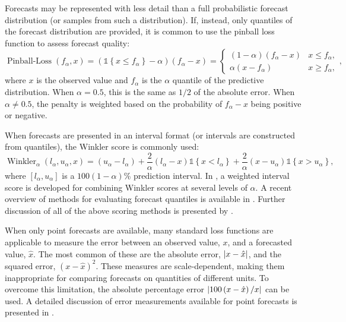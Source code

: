 Forecasts may be represented with less detail than a full probabilistic forecast distribution (or samples from such a distribution).
If, instead, only quantiles of the forecast distribution are provided, it is common to use the pinball loss function  to assess forecast quality:
\begin{equation}
    \operatorname{Pinball-Loss}(f_\alpha, x) = \left( \mathds{1} \left\{ x \leq f_\alpha \right\} - \alpha \right) \left( f_\alpha - x \right) =
    \begin{cases}
    \left( 1 - \alpha \right) \left( f_\alpha - x \right)   &   x \leq f_\alpha,\\
    \alpha \left( x - f_\alpha \right)  &   x \geq f_\alpha,
    \end{cases},
    \label{ch_2:eqn:pinball_loss}
\end{equation}
where \( x \) is the observed value and \( f_\alpha \) is the \( \alpha \) quantile of the predictive distribution.
When \( \alpha = 0.5 \), this is the same as \( 1 / 2  \) of the absolute error.
When \( \alpha \neq 0.5 \), the penalty is weighted based on the probability of \( f_\alpha - x \) being positive or negative.

When forecasts are presented in an interval format (or intervals are constructed from quantiles), the Winkler score is commonly used:
\begin{equation}
    \operatorname{Winkler}_\alpha \left( l_\alpha, u_\alpha, x \right) = \left( u_\alpha - l_\alpha \right) + \frac{2}{\alpha} \left( l_\alpha - x \right) \mathds{1} \left\{ x < l_\alpha \right\} + \frac{2}{\alpha} \left( x - u_\alpha \right) \mathds{1} \left\{ x > u_\alpha \right\},
\end{equation}
where \( \left[ l_\alpha, u_\alpha \right] \) is a \( 100 (1 - \alpha) \)\% prediction interval.
In \citep{Bracher2021Evaluating}, a weighted interval score is developed for combining Winkler scores at several levels of \( \alpha \).
A recent overview of methods for evaluating forecast quantiles is available in \citep{Gneiting2023Model}.
Further discussion of all of the above scoring methods is presented by \citet{gneiting2007strictly}.

When only point forecasts are available, many standard loss functions are applicable to measure the error between an observed value, \( x \), and a forecasted value, \( \hat{x} \).
The most common of these are the absolute error, \( \abs{x - \hat{x}} \), and the squared error, \( \left( x - \hat{x} \right)^2 \).
These measures are scale-dependent, making them inappropriate for comparing forecasts on quantities of different units.
To overcome this limitation, the absolute percentage error \( \abs{100 \left( x - \hat{x} \right)/ x} \) can be used.
A detailed discussion of error measurements available for point forecasts is presented in \citet{Hyndman2006Another}.

